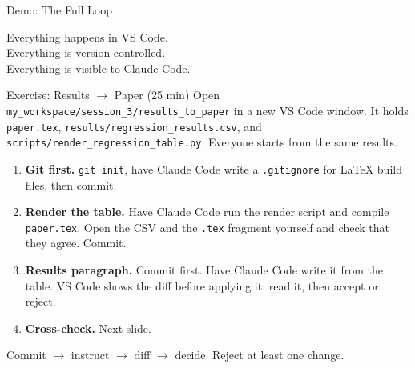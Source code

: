 \documentclass[aspectratio=169, 11pt]{beamer}
\begin{document}

\begin{frame}{Demo: The Full Loop}
  \centering
  \vspace{1em}

  \vspace{1.5em}
  {\large Everything happens in VS Code.\\[0.3em]
  Everything is version-controlled.\\[0.3em]
  Everything is visible to Claude Code.}
\end{frame}

\begin{frame}{Exercise: Results $\rightarrow$ Paper (25 min)}
  Open \texttt{my\_workspace/session\_3/results\_to\_paper} in a new VS Code window. It holds \texttt{paper.tex}, \texttt{results/regression\_results.csv}, and \texttt{scripts/render\_regression\_table.py}. Everyone starts from the same results.

  \vspace{0.4em}
  \begin{enumerate}
    \small
    \item \textbf{Git first.} \texttt{git init}, have Claude Code write a \texttt{.gitignore} for \LaTeX{} build files, then commit.
    \item \textbf{Render the table.} Have Claude Code run the render script and compile \texttt{paper.tex}. Open the CSV and the \texttt{.tex} fragment yourself and check that they agree. Commit.
    \item \textbf{Results paragraph.} Commit first. Have Claude Code write it from the table. VS Code shows the diff before applying it: read it, then accept or reject.
    \item \textbf{Cross-check.} Next slide.
  \end{enumerate}

  \vspace{0.3em}
  \alert{\small Commit $\rightarrow$ instruct $\rightarrow$ diff $\rightarrow$ decide. Reject at least one change.}
\end{frame}
\end{document}
